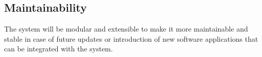 \subsection{Maintainability}
The system will be modular and extensible to make it more maintainable and stable in case of future updates or introduction of new software applications that can be integrated with the system.